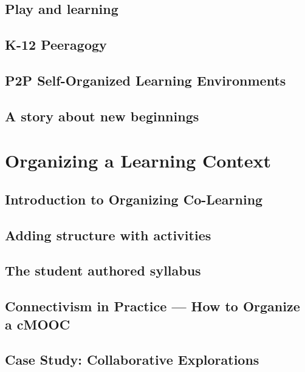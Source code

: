 \documentclass[ebook, 12pt, twoside]{memoir}
\begin{document}
\chapter[\textbf{Play and learning}]{Play and learning}
%

%
\chapter[\textbf{K-12 Peeragogy}]{K-12 Peeragogy}
%

%
\chapter[\textbf{P2P SOLE}]{P2P Self-Organized Learning Environments}
%

%
\chapter[\textbf{A story about new beginnings}]{A story about new beginnings}
%




\part{Organizing a Learning Context} %
%
\chapter[\textbf{Organizing Co-Learning}]{Introduction to Organizing Co-Learning}

%
\chapter[\textbf{Adding structure}]{Adding structure with activities}
%

%
\chapter[\textbf{The student authored syllabus}]{ The student authored syllabus } 
%

%
\chapter[\textbf{How to Organize a MOOC}]{ Connectivism in Practice ---  How to Organize a cMOOC}
%

%
\chapter[\textbf{Case Study: Collaborative Explorations}]{ Case Study: Collaborative Explorations}
%

\end{document}
